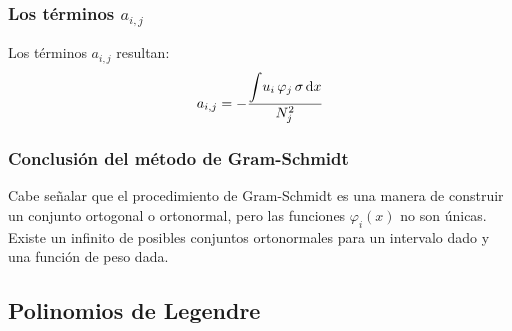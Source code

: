 \documentclass[12pt]{beamer}
\begin{document}
\begin{frame}
\frametitle{Los términos $a_{i,j}$}
Los términos $a_{i,j}$ resultan:
\pause
\begin{align}
a_{i, j} = - \dfrac{ \displaystyle \scaleint{5ex} u_{i} \, \varphi_{j} \, \sigma \dd{x}}{N_{j}^{2}}
\label{eq:ecuacion_10_49a}
\end{align}
\end{frame}
\begin{frame}
\frametitle{Conclusión del método de Gram-Schmidt}
Cabe señalar que el procedimiento de Gram-Schmidt es una manera de construir un conjunto ortogonal o ortonormal, \pause pero las funciones $\varphi_{i}(x)$ no son únicas.
\\
\bigskip
\pause
Existe un infinito de posibles conjuntos ortonormales para un intervalo dado y una función de peso dada.
\end{frame}

\subsection{Polinomios de Legendre}
\end{document}
